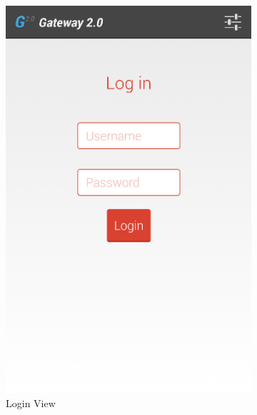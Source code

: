 \begin{figure}[H]
\centering
    \begin{subfigure}[b]{0.49\textwidth}
        \includegraphics[width=\textwidth]{img/interface/1-Login.png}
        \caption*{Login View}
        \label{fig:01login}
    \end{subfigure}
    \begin{subfigure}[b]{0.49\textwidth}

\end{subfigure}
\end{figure}
